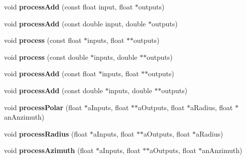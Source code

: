 \begin{DoxyCompactItemize}
\item 
\hypertarget{class_ambisonic_map_aea7d35fae8438f666b4eea5585a07f74}{void {\bfseries process\-Add} (const float input, float $\ast$outputs)}\label{class_ambisonic_map_aea7d35fae8438f666b4eea5585a07f74}

\item 
\hypertarget{class_ambisonic_map_a9abb827640018cfd1f5e86935f9092c7}{void {\bfseries process\-Add} (const double input, double $\ast$outputs)}\label{class_ambisonic_map_a9abb827640018cfd1f5e86935f9092c7}

\item 
\hypertarget{class_ambisonic_map_ad7cb34156a5d4d789f1479a1019d9c1c}{void {\bfseries process} (const float $\ast$inputs, float $\ast$$\ast$outputs)}\label{class_ambisonic_map_ad7cb34156a5d4d789f1479a1019d9c1c}

\item 
\hypertarget{class_ambisonic_map_a13109859dbeaa8a8dc3a8d06f5a4ae62}{void {\bfseries process} (const double $\ast$inputs, double $\ast$$\ast$outputs)}\label{class_ambisonic_map_a13109859dbeaa8a8dc3a8d06f5a4ae62}

\item 
\hypertarget{class_ambisonic_map_a4c88c3b760261a67db7f4e76dc8c17b9}{void {\bfseries process\-Add} (const float $\ast$inputs, float $\ast$$\ast$outputs)}\label{class_ambisonic_map_a4c88c3b760261a67db7f4e76dc8c17b9}

\item 
\hypertarget{class_ambisonic_map_a4d1eeb599f7506dbf7e93df519c4e0fb}{void {\bfseries process\-Add} (const double $\ast$inputs, double $\ast$$\ast$outputs)}\label{class_ambisonic_map_a4d1eeb599f7506dbf7e93df519c4e0fb}

\item 
\hypertarget{class_ambisonic_map_a7b674577b2834fe36ed20ea7f68877b1}{void {\bfseries process\-Polar} (float $\ast$a\-Inputs, float $\ast$$\ast$a\-Outputs, float $\ast$a\-Radius, float $\ast$an\-Anzimuth)}\label{class_ambisonic_map_a7b674577b2834fe36ed20ea7f68877b1}

\item 
\hypertarget{class_ambisonic_map_acb84274dee80c8b28cd5ad1575132f67}{void {\bfseries process\-Radius} (float $\ast$a\-Inputs, float $\ast$$\ast$a\-Outputs, float $\ast$a\-Radius)}\label{class_ambisonic_map_acb84274dee80c8b28cd5ad1575132f67}

\item 
\hypertarget{class_ambisonic_map_a01109c4d0fa5b3984e0f463a8264002d}{void {\bfseries process\-Azimuth} (float $\ast$a\-Inputs, float $\ast$$\ast$a\-Outputs, float $\ast$an\-Anzimuth)}\label{class_ambisonic_map_a01109c4d0fa5b3984e0f463a8264002d}


\end{DoxyCompactItemize}
